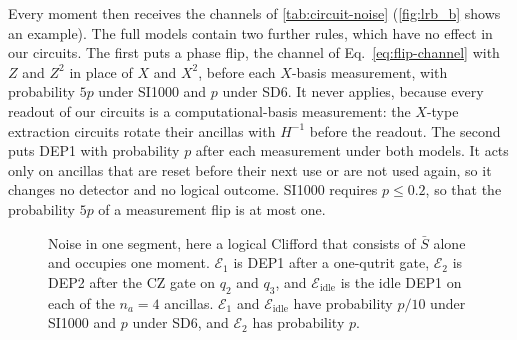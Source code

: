 Every moment then receives the channels of \autoref{tab:circuit-noise} (\autoref{fig:lrb_b} shows an example). The full models contain two further rules, which have no effect in our circuits. The first puts a phase flip, the channel of Eq.~\eqref{eq:flip-channel} with $Z$ and $Z^2$ in place of $X$ and $X^2$, before each $X$-basis measurement, with probability $5p$ under SI1000 and $p$ under SD6. It never applies, because every readout of our circuits is a computational-basis measurement: the $X$-type extraction circuits rotate their ancillas with $H^{-1}$ before the readout. The second puts DEP1 with probability $p$ after each measurement under both models. It acts only on ancillas that are reset before their next use or are not used again, so it changes no detector and no logical outcome. SI1000 requires $p \le 0.2$, so that the probability $5p$ of a measurement flip is at most one.

\begin{figure}[tb]
    \centering
    \caption{Noise in one segment, here a logical Clifford that consists of $\bar S$ alone and occupies one moment. $\mathcal{E}_1$ is DEP1 after a one-qutrit gate, $\mathcal{E}_2$ is DEP2 after the CZ gate on $q_2$ and $q_3$, and $\mathcal{E}_{\mathrm{idle}}$ is the idle DEP1 on each of the $n_a = 4$ ancillas. $\mathcal{E}_1$ and $\mathcal{E}_{\mathrm{idle}}$ have probability $p/10$ under SI1000 and $p$ under SD6, and $\mathcal{E}_2$ has probability $p$.}
    \label{fig:lrb_b}\label{fig:rounds_segment_noise}
\end{figure}

